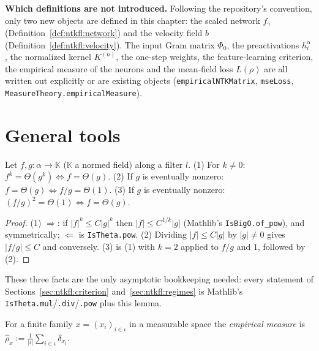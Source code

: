 \medskip\noindent\textbf{Which definitions are not introduced.}
Following the repository's convention, only two new objects are defined in this chapter:
the scaled network $f_\gamma$ (Definition~\ref{def:ntkfl:network}) and the velocity field $b$
(Definition~\ref{def:ntkfl:velocity}). The input Gram matrix $\Phi_0$, the preactivations $h_i^\alpha$, the
normalized kernel $K^{(n)}$, the one-step weights, the feature-learning criterion, the empirical measure of the neurons
and the mean-field loss $L(\rho)$ are all written out explicitly or are existing objects
(\texttt{empiricalNTKMatrix}, \texttt{mseLoss}, \texttt{MeasureTheory.empiricalMeasure}).


\section{General tools}\label{sec:ntkfl:tools}

\begin{lemma}\label{lem:ntkfl:theta}
  \leanok
Let $f,g:\alpha\to\mathbb K$ ($\mathbb K$ a normed field) along a filter $l$.
(1) For $k\ne0$: $f^k=\Theta(g^k)\iff f=\Theta(g)$.
(2) If $g$ is eventually nonzero: $f=\Theta(g)\iff f/g=\Theta(1)$.
(3) If $g$ is eventually nonzero: $(f/g)^2=\Theta(1)\iff f=\Theta(g)$.
\end{lemma}

\begin{proof}
  \leanok
(1) $\Rightarrow$: if $|f|^k\le C|g|^k$ then $|f|\le C^{1/k}|g|$ (Mathlib's \texttt{IsBigO.of\_pow}), and symmetrically;
$\Leftarrow$ is \texttt{IsTheta.pow}. (2) Dividing $|f|\le C|g|$ by $|g|\neq0$ gives $|f/g|\le C$ and conversely.
(3) is (1) with $k=2$ applied to $f/g$ and $1$, followed by (2).
\end{proof}

These three facts are the only asymptotic bookkeeping needed: every statement of Sections~\ref{sec:ntkfl:criterion}
and~\ref{sec:ntkfl:regimes} is Mathlib's \texttt{IsTheta.mul}/\texttt{.div}/\texttt{.pow} plus this lemma.

\begin{definition}\label{def:ntkfl:empirical}
  \leanok
For a finite family $x=(x_i)_{i\in\iota}$ in a measurable space the \emph{empirical measure} is
$\hat\rho_x:=\frac1{|\iota|}\sum_{i\in\iota}\delta_{x_i}$.
\end{definition}

